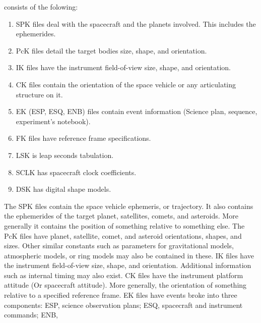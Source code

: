 \documentclass[crop=false,class=article,oneside]{standalone}
\begin{document}
            consists of the folowing:
            \begin{enumerate}
                \item SPK files deal with the spacecraft and
                      the planets involved. This includes
                      the ephemerides.
                \item PcK files detail the target bodies size,
                      shape, and orientation.
                \item IK files have the instrument field-of-view
                      size, shape, and orientation.
                \item CK files contain the orientation of
                      the space vehicle or any articulating
                      structure on it.
                \item EK (ESP, ESQ, ENB) files contain event
                      information (Science plan, sequence,
                      experiment's notebook).
                \item FK files have reference frame
                      specifications.
                \item LSK is leap seconds tabulation.
                \item SCLK has spacecraft clock coefficients.
                \item DSK has digital shape models.
            \end{enumerate}
            The SPK files contain the space vehicle ephemeris,
            or trajectory. It also contains the ephemerides of
            the target planet, satellites, comets, and asteroids.
            More generally it contains the position of something
            relative to something else. The PcK files have
            planet, satellite, comet, and asteroid orientations,
            shapes, and sizes. Other similar constants such
            as parameters for gravitational models, atmospheric
            models, or ring models may also be contained in
            these. IK files have the instrument field-of-view
            size, shape, and orientation. Additional information
            such as internal timing may also exist. CK files
            have the instrument platform attitude
            (Or spacecraft attitude). More generally, the
            orientation of something relative to a specified
            reference frame. EK files have events broke into
            three components: ESP, science observation plans;
            ESQ, spacecraft and instrument commands; ENB,
\end{document}
